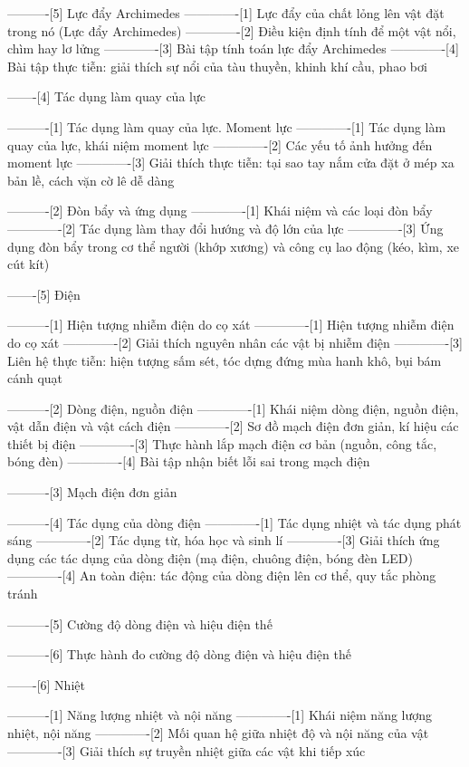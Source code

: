 ----------[5] Lực đẩy Archimedes
-------------[1] Lực đẩy của chất lỏng lên vật đặt trong nó (Lực đẩy Archimedes)
-------------[2] Điều kiện định tính để một vật nổi, chìm hay lơ lửng
-------------[3] Bài tập tính toán lực đẩy Archimedes
-------------[4] Bài tập thực tiễn: giải thích sự nổi của tàu thuyền, khinh khí cầu, phao bơi

-------[4] Tác dụng làm quay của lực

----------[1] Tác dụng làm quay của lực. Moment lực
-------------[1] Tác dụng làm quay của lực, khái niệm moment lực
-------------[2] Các yếu tố ảnh hưởng đến moment lực
-------------[3] Giải thích thực tiễn: tại sao tay nắm cửa đặt ở mép xa bản lề, cách vặn cờ lê dễ dàng

----------[2] Đòn bẩy và ứng dụng
-------------[1] Khái niệm và các loại đòn bẩy
-------------[2] Tác dụng làm thay đổi hướng và độ lớn của lực
-------------[3] Ứng dụng đòn bẩy trong cơ thể người (khớp xương) và công cụ lao động (kéo, kìm, xe cút kít)

-------[5] Điện

----------[1] Hiện tượng nhiễm điện do cọ xát
-------------[1] Hiện tượng nhiễm điện do cọ xát
-------------[2] Giải thích nguyên nhân các vật bị nhiễm điện
-------------[3] Liên hệ thực tiễn: hiện tượng sấm sét, tóc dựng đứng mùa hanh khô, bụi bám cánh quạt

----------[2] Dòng điện, nguồn điện
-------------[1] Khái niệm dòng điện, nguồn điện, vật dẫn điện và vật cách điện
-------------[2] Sơ đồ mạch điện đơn giản, kí hiệu các thiết bị điện
-------------[3] Thực hành lắp mạch điện cơ bản (nguồn, công tắc, bóng đèn)
-------------[4] Bài tập nhận biết lỗi sai trong mạch điện

----------[3] Mạch điện đơn giản

----------[4] Tác dụng của dòng điện
-------------[1] Tác dụng nhiệt và tác dụng phát sáng
-------------[2] Tác dụng từ, hóa học và sinh lí
-------------[3] Giải thích ứng dụng các tác dụng của dòng điện (mạ điện, chuông điện, bóng đèn LED)
-------------[4] An toàn điện: tác động của dòng điện lên cơ thể, quy tắc phòng tránh

----------[5] Cường độ dòng điện và hiệu điện thế

----------[6] Thực hành đo cường độ dòng điện và hiệu điện thế

-------[6] Nhiệt

----------[1] Năng lượng nhiệt và nội năng
-------------[1] Khái niệm năng lượng nhiệt, nội năng
-------------[2] Mối quan hệ giữa nhiệt độ và nội năng của vật
-------------[3] Giải thích sự truyền nhiệt giữa các vật khi tiếp xúc

